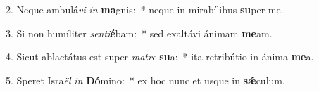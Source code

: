 2. Neque ambulá\textit{vi} \textit{in} \textbf{ma}gnis:~*  neque in mirabílibus \textbf{su}per me.\

3. Si non humíliter \textit{sen}\textit{ti}\textbf{é}bam:~*  sed exaltávi ánimam \textbf{me}am.\

4. Sicut ablactátus est super \textit{ma}\textit{tre} \textbf{su}a:~*  ita retribútio in ánima \textbf{me}a.\

5. Speret Isra\textit{ël} \textit{in} \textbf{Dó}mino:~*  ex hoc nunc et usque in \textbf{sǽ}culum.\

